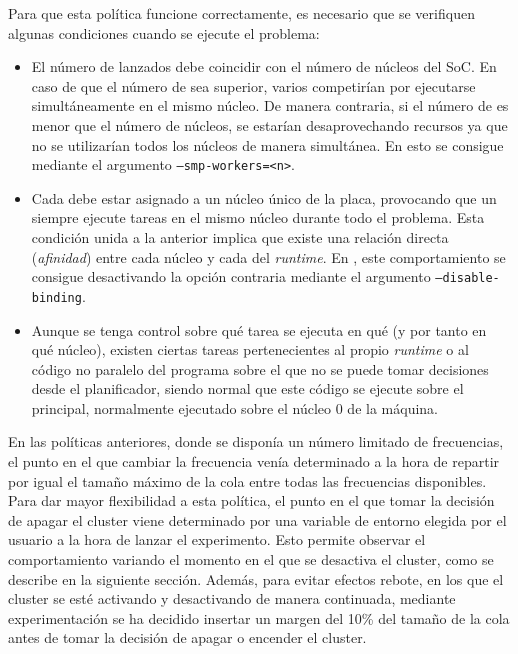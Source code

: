 Para que esta política funcione correctamente, es necesario que se verifiquen algunas
condiciones cuando se ejecute el problema:

\begin{itemize}
\item El número de \wts lanzados debe coincidir con el número de núcleos del
  SoC. En caso de que el número de \wts sea superior, varios \wts
  competirían por ejecutarse simultáneamente en el mismo núcleo. De manera
  contraria, si el número de \wts es menor que el número de núcleos, se
  estarían desaprovechando recursos ya que no se utilizarían todos los
  núcleos de manera simultánea. En \nanos esto se consigue mediante el
  argumento \texttt{--smp-workers=<n>}.
\item Cada \wt debe estar asignado a un núcleo único de la placa,
  provocando que un \wt siempre ejecute tareas en el mismo núcleo durante
  todo el problema. Esta condición unida a la anterior implica que existe una
  relación directa ({\em afinidad}) entre cada núcleo y cada \wt del \emph{runtime}. En
  \nanos, este comportamiento se consigue desactivando la opción contraria
		mediante el argumento \texttt{--disable-binding}.
\item Aunque se tenga control sobre qué tarea se ejecuta en qué \wt (y por
  tanto en qué núcleo), existen ciertas tareas pertenecientes al propio
  \emph{runtime} o al código no paralelo del programa sobre el que no se
  puede tomar decisiones desde el planificador, siendo normal que este
  código se ejecute sobre el \wt principal, normalmente ejecutado sobre el
  núcleo 0 de la máquina.
\end{itemize}


En las políticas anteriores, donde se disponía un número limitado de
frecuencias, el punto en el que cambiar la frecuencia venía determinado a
la hora de repartir por igual el tamaño máximo de la cola entre todas las
frecuencias disponibles. Para dar mayor flexibilidad a esta política, el
punto en el que tomar la decisión de apagar el cluster viene determinado
por una variable de entorno elegida por el usuario a la hora de lanzar el
experimento. Esto permite observar el comportamiento variando el momento en
el que se desactiva el cluster, como se describe en la siguiente
sección. Además, para evitar efectos rebote, en los que el cluster se esté
activando y desactivando de manera continuada, mediante experimentación se
ha decidido insertar un margen del 10\% del tamaño de la cola antes de
tomar la decisión de apagar o encender el cluster.

